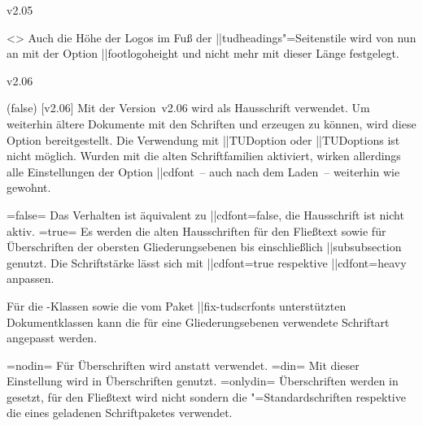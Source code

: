 \begin{Entity}{}
\begin{Changes}{v2.05}
\begin{Obsolete}
  {}
  <>
\printdeclarationlist
%
Auch die Höhe der Logos im Fuß der \PageStyle||{tudheadings}"=Seitenstile wird 
von nun an mit der Option \Option||{footlogoheight} und nicht mehr mit dieser 
Länge festgelegt.
\end{Obsolete}
\end{Changes}



\begin{Changes}{v2.06}
\begin{Declaration}
  {}
  (false)
  [v2.06]
\printdeclarationlist
%
Mit der Version~v2.06 wird \OpenSans als Hausschrift verwendet. Um weiterhin 
ältere Dokumente mit den Schriften \Univers und \DIN erzeugen zu können, wird 
diese Option bereitgestellt.
Die Verwendung mit \Macro||{TUDoption} oder \Macro||{TUDoptions} ist nicht 
möglich. Wurden mit  die alten Schriftfamilien aktiviert, 
wirken allerdings alle Einstellungen der Option \Option||{cdfont}~-- auch nach 
dem Laden~-- weiterhin wie gewohnt.
%
\begin{DeclareValues}
\itemval=false=
  Das Verhalten ist äquivalent zu \Option||{cdfont=false}, die Hausschrift ist 
  nicht aktiv.
\itemval*=true=
  Es werden die alten Hausschriften \Univers für den Fließtext sowie \DIN für 
  Überschriften der obersten Gliederungsebenen bis einschließlich 
  \Macro||{subsubsection} genutzt. Die Schriftstärke lässt sich mit 
  \Option||{cdfont=true} respektive \Option||{cdfont=heavy} anpassen.
\end{DeclareValues}
%
Für die \TUDScript-Klassen sowie die vom Paket \Package||{fix-tudscrfonts} 
unterstützten Dokumentklassen kann die für eine Gliederungsebenen verwendete 
Schriftart angepasst werden.
%
\begin{DeclareValues}
\itemval=nodin=
  Für Überschriften wird \Univers anstatt \DIN verwendet.
\itemval=din=
  Mit dieser Einstellung wird \DIN in Überschriften genutzt. 
\itemval=onlydin=
  Überschriften werden in \DIN gesetzt, für den Fließtext wird nicht \Univers 
  sondern die "=Standardschriften respektive die eines geladenen 
  Schriftpaketes verwendet.
\end{DeclareValues}
\end{Declaration}


\end{Changes}
\end{Entity}
